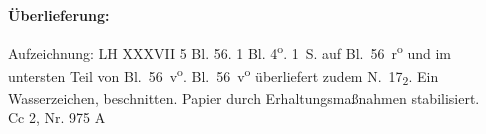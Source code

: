 	\begin{ledgroupsized}[r]{120mm}
	\footnotesize 
	\pstart 
	\noindent\textbf{\"{U}berlieferung:}
	\pend
	\end{ledgroupsized}
	\begin{ledgroupsized}[r]{114mm}
	\footnotesize 
	\pstart \parindent -6mm
	Aufzeichnung:
LH XXXVII 5 Bl. 56.
1 Bl. 4\textsuperscript{o}.
1\, S. auf Bl.~56~r\textsuperscript{o} und im untersten Teil von Bl.~56~v\textsuperscript{o}.
Bl.~56~v\textsuperscript{o} überliefert zudem N.~17\textsubscript{2}.
Ein Wasserzeichen, beschnitten.
Papier durch Erhaltungsma{\ss}nahmen stabilisiert.%
	\\Cc 2, Nr. 975 A\pend
	\end{ledgroupsized}
	
	\count{}
	\count{}

